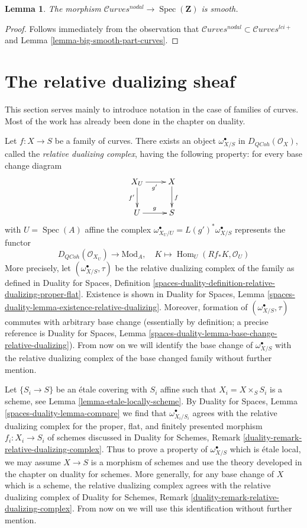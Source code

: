 \documentclass{stacks-project}
\theoremstyle{plain}
\newtheorem{lemma}[subsection]{Lemma}
\theoremstyle{definition}
\theoremstyle{remark}
\numberwithin{equation}{subsection}
\def\Spec{\mathop{\mathrm{Spec}}}
\def\Hom{\mathop{\mathrm{Hom}}\nolimits}
\def\QCoh{\mathit{QCoh}}
\def\Curvesstack{\mathcal{C}\!\mathit{urves}}
\begin{document}
\begin{lemma}
\label{lemma-nodal-curves-smooth}
The morphism $\Curvesstack^{nodal} \to \Spec(\mathbf{Z})$ is smooth.
\end{lemma}

\begin{proof}
Follows immediately from the observation that
$\Curvesstack^{nodal} \subset \Curvesstack^{lci+}$
and Lemma \ref{lemma-big-smooth-part-curves}.
\end{proof}




\section{The relative dualizing sheaf}
\label{section-relative-dualizing}

\noindent
This section serves mainly
to introduce notation in the case of families of curves.
Most of the work has already been done in the chapter on duality.

\medskip\noindent
Let $f : X \to S$ be a family of curves. There exists an object
$\omega_{X/S}^\bullet$ in $D_\QCoh(\mathcal{O}_X)$,
called the {\it relative dualizing complex}, having the following
property: for every base change diagram
$$
\xymatrix{
X_U \ar[d]_{f'} \ar[r]_{g'} & X \ar[d]^f \\
U \ar[r]^g & S
}
$$
with $U = \Spec(A)$ affine the complex
$\omega_{X_U/U}^\bullet = L(g')^*\omega_{X/S}^\bullet$
represents the functor
$$
D_\QCoh(\mathcal{O}_{X_U}) \longrightarrow \text{Mod}_A,\quad
K \longmapsto \Hom_U(Rf_*K, \mathcal{O}_U)
$$
More precisely, let $(\omega_{X/S}^\bullet, \tau)$
be the relative dualizing complex of the family as defined in
Duality for Spaces, Definition
\ref{spaces-duality-definition-relative-dualizing-proper-flat}.
Existence is shown in Duality for Spaces, Lemma
\ref{spaces-duality-lemma-existence-relative-dualizing}.
Moreover, formation of $(\omega_{X/S}^\bullet, \tau)$ commutes
with arbitrary base change (essentially by definition; a precise
reference is Duality for Spaces, Lemma
\ref{spaces-duality-lemma-base-change-relative-dualizing}).
From now on we will identify the base change of
$\omega_{X/S}^\bullet$ with the relative dualizing
complex of the base changed family without further mention.

\medskip\noindent
Let $\{S_i \to S\}$ be an \'etale covering with $S_i$ affine such that
$X_i = X \times_S S_i$ is a scheme, see Lemma \ref{lemma-etale-locally-scheme}.
By Duality for Spaces, Lemma \ref{spaces-duality-lemma-compare}
we find that $\omega_{X_i/S_i}^\bullet$ agrees with
the relative dualizing complex for the proper, flat, and
finitely presented morphism $f_i : X_i \to S_i$ of schemes
discussed in Duality for Schemes, Remark
\ref{duality-remark-relative-dualizing-complex}.
Thus to prove a property of $\omega_{X/S}^\bullet$
which is \'etale local, we may assume $X \to S$ is a morphism of schemes
and use the theory developed in the chapter on duality for schemes.
More generally, for any base change of $X$ which is a scheme,
the relative dualizing complex agrees with the
relative dualizing complex of Duality for Schemes, Remark
\ref{duality-remark-relative-dualizing-complex}.
From now on we will use this identification without further mention.
\end{document}
